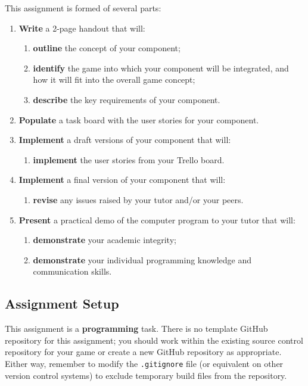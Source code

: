 \documentclass{../../fal_assignment}
\begin{document}
This assignment is formed of several parts:
\begin{enumerate}[label=(\Alph*)]
	\item \textbf{Write} a 2-page handout that will:
		\begin{enumerate}[label=(\roman*)]
			\item \textbf{outline} the concept of your component;
			\item \textbf{identify} the game into which your component will be integrated, and how it will fit into
				the overall game concept;
			\item \textbf{describe} the key requirements of your component.
		\end{enumerate}
	\item \textbf{Populate} a task board with the user stories for your component.
	\item \textbf{Implement} a draft versions of your component that will:
		\begin{enumerate}[label=(\roman*)]
			\item \textbf{implement} the user stories from your Trello board.
		\end{enumerate}
	\item \textbf{Implement} a final version of your component that will:
		\begin{enumerate}[label=(\roman*)]
			\item \textbf{revise} any issues raised by your tutor and/or your peers.
		\end{enumerate}
	\item \textbf{Present} a practical demo of the computer program to your tutor that will:
		\begin{enumerate}[label=(\roman*)]
			\item \textbf{demonstrate} your academic integrity;
			\item \textbf{demonstrate} your individual programming knowledge and communication skills.
		\end{enumerate}
\end{enumerate}

\subsection*{Assignment Setup}

This assignment is a \textbf{programming} task.
There is no template GitHub repository for this assignment;
you should work within the existing source control repository for your game
or create a new GitHub repository as appropriate.
Either way, remember to modify the \texttt{.gitignore} file (or equivalent on other version control systems) to exclude temporary build files
from the repository.
\end{document}
